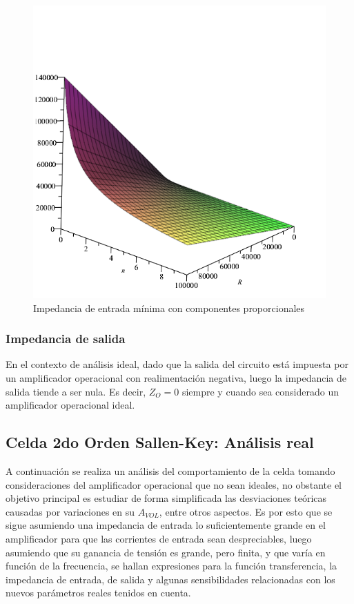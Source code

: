 \begin{figure}[H]
    \centering
    \includegraphics[scale=0.7]{../EJ1/Recursos/impedancia_entrada_componentes_proporcionales.png}
    \caption{Impedancia de entrada m\'inima con componentes proporcionales}
\end{figure}

\subsubsection{Impedancia de salida}
En el contexto de an\'alisis ideal, dado que la salida del circuito est\'a impuesta por un amplificador operacional con realimentaci\'on negativa,
luego la impedancia de salida tiende a ser nula. Es decir, $Z_O = 0$ siempre y cuando sea considerado un amplificador operacional ideal.

\subsection{Celda 2do Orden Sallen-Key: An\'alisis real}
A continuaci\'on se realiza un an\'alisis del comportamiento de la celda tomando consideraciones del amplificador operacional que no sean ideales,
no obstante el objetivo principal es estudiar de forma simplificada las desviaciones te\'oricas causadas por variaciones en su $A_{VOL}$, entre otros aspectos.
Es por esto que se sigue asumiendo una impedancia de entrada lo suficientemente grande en el amplificador para que las corrientes de entrada sean despreciables,
luego asumiendo que su ganancia de tensi\'on es grande, pero finita, y que var\'ia en funci\'on de la frecuencia, se hallan expresiones para la funci\'on transferencia,
la impedancia de entrada, de salida y algunas sensibilidades relacionadas con los nuevos par\'ametros reales tenidos en cuenta. 


